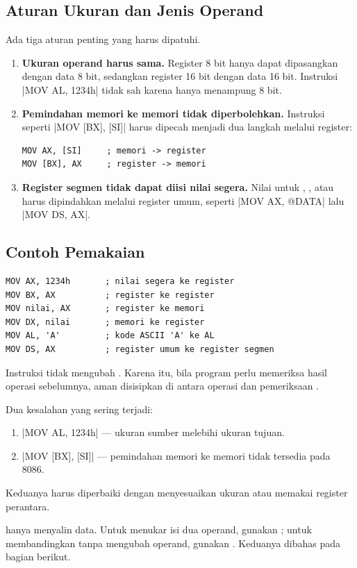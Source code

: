 \subsection{Aturan Ukuran dan Jenis Operand}

Ada tiga aturan penting yang harus dipatuhi.

\begin{enumerate}
    \item \textbf{Ukuran operand harus sama.} Register 8 bit hanya
          dapat dipasangkan dengan data 8 bit, sedangkan register
          16 bit dengan data 16 bit. Instruksi
          \lstasm|MOV AL, 1234h| tidak sah karena  hanya
          menampung 8 bit.

    \item \textbf{Pemindahan memori ke memori tidak diperbolehkan.}
          Instruksi seperti \lstasm|MOV [BX], [SI]| harus dipecah
          menjadi dua langkah melalui register:
\begin{lstlisting}[language=MASM, numbers=none]
MOV AX, [SI]     ; memori -> register
MOV [BX], AX     ; register -> memori
\end{lstlisting}

    \item \textbf{Register segmen tidak dapat diisi nilai segera.}
          Nilai untuk , , atau  harus
          dipindahkan melalui register umum, seperti
          \lstasm|MOV AX, @DATA| lalu \lstasm|MOV DS, AX|.
\end{enumerate}

\subsection{Contoh Pemakaian}

\begin{lstlisting}[language=MASM, numbers=none]
MOV AX, 1234h       ; nilai segera ke register
MOV BX, AX          ; register ke register
MOV nilai, AX       ; register ke memori
MOV DX, nilai       ; memori ke register
MOV AL, 'A'         ; kode ASCII 'A' ke AL
MOV DS, AX          ; register umum ke register segmen
\end{lstlisting}

Instruksi  tidak mengubah . Karena itu, bila
program perlu memeriksa hasil operasi sebelumnya,  aman
disisipkan di antara operasi dan pemeriksaan .

\begin{peringatanbox}
\vspace{1.1em}
Dua kesalahan yang sering terjadi:
\begin{enumerate}
    \item \lstasm|MOV AL, 1234h| --- ukuran sumber melebihi ukuran
          tujuan.
    \item \lstasm|MOV [BX], [SI]| --- pemindahan memori ke memori
          tidak tersedia pada 8086.
\end{enumerate}
Keduanya harus diperbaiki dengan menyesuaikan ukuran atau memakai
register perantara.
\end{peringatanbox}

\begin{infobox}
\vspace{1.1em}
 hanya menyalin data. Untuk menukar isi dua operand,
gunakan ; untuk membandingkan tanpa mengubah operand,
gunakan . Keduanya dibahas pada bagian berikut.
\end{infobox}
